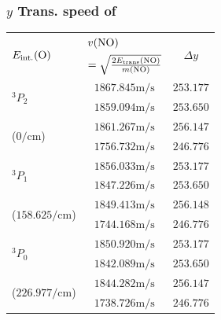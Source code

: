\documentclass[aspectratio=43,scheme=plain]{ctexbeamer}
\begin{document}
	\subsubsection{$y$ Trans. speed of }
	\begin{frame}{\insertsubsection}{\insertsubsubsection}
\begin{table}[htbp]  
	\centering  
	\tiny   
	\begin{tabular}{l|cc}    
		\toprule
		\multicolumn{1}{l}{\multirow{2}[1]{*}{$E_\text{int.}(\ce{O})$}} & \multicolumn{1}{l}{$v(\ce{NO}) $} & \multirow{2}[1]{*}{$\Delta y $} \\    
		\multicolumn{1}{l}{} & \multicolumn{1}{l}{$= \sqrt {  \frac{2E_\text{trans}(\ce{NO})}{m(\ce{NO})}   }$} &  \\    
		\midrule
		\multirow{2}[1]{*}{$^3 P_2$} & $1867.845 \unit{\meter \per \second}$ & $253.177$ \\          
		& $1859.094 \unit{\meter \per \second}$ & $253.650$ \\    
		\multirow{2}[1]{*}{($\num{0}\unit{\per \centi \meter}$)} & $1861.267 \unit{\meter \per \second}$ & $256.147$ \\          
		& $1756.732 \unit{\meter \per \second}$ & $246.776$ \\    
		\midrule    
		\multirow{2}[1]{*}{$^3 P_1$} & $1856.033 \unit{\meter \per \second}$ & $253.177$ \\          
		& $1847.226 \unit{\meter \per \second}$ & $253.650$ \\    
		\multirow{2}[1]{*}{($\num{158.625}\unit{\per \centi \meter}$)} & $1849.413 \unit{\meter \per \second}$ & $256.148$ \\          
		& $1744.168 \unit{\meter \per \second}$ & $246.776$ \\    
		\midrule    
		\multirow{2}[1]{*}{$^3 P_0$} & $1850.920 \unit{\meter \per \second}$ & $253.177$ \\          
		& $1842.089 \unit{\meter \per \second}$ & $253.650$ \\    
		\multirow{2}[1]{*}{($\num{226.977}\unit{\per \centi \meter}$)} & $1844.282 \unit{\meter \per \second}$ & $256.147$ \\          
		& $1738.726 \unit{\meter \per \second}$ & $246.776$ \\    		\bottomrule    
		\end{tabular}
	\end{table}%
\end{frame}
\end{document}
